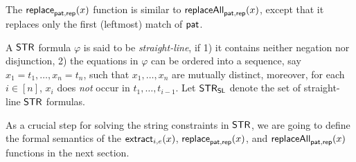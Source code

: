 The $\mathsf{replace}_{\mathsf{pat}, \mathsf{rep}}(x)$ function is similar to $\mathsf{replaceAll}_{\mathsf{pat}, \mathsf{rep}}(x)$, except that it replaces only the first (leftmost) match of $\mathsf{pat}$.

A $\mathsf{STR}$ formula $\varphi$ is said to be \emph{straight-line}, if 1) it contains neither negation nor disjunction, 2) the equations in $\varphi$ can be ordered into a sequence, say $x_1 = t_1, \ldots, x_n = t_n$, such that $x_1,\ldots, x_n$ are mutually distinct, moreover, for each $i \in [n]$, $x_i$ does \emph{not} occur in $t_1, \ldots, t_{i-1}$. Let $\mathsf{STR}_{\mathsf{SL}}$ denote the set of straight-line $\mathsf{STR}$ formulas.

As a crucial step for solving the string constraints in $\mathsf{STR}$, we are going to define the formal semantics of the $\mathsf{extract}_{i, e}(x)$, $\mathsf{replace}_{\mathsf{pat}, \mathsf{rep}}(x)$, and $\mathsf{replaceAll}_{\mathsf{pat}, \mathsf{rep}}(x)$ functions in the next section.

%
%
%
%
%
%
